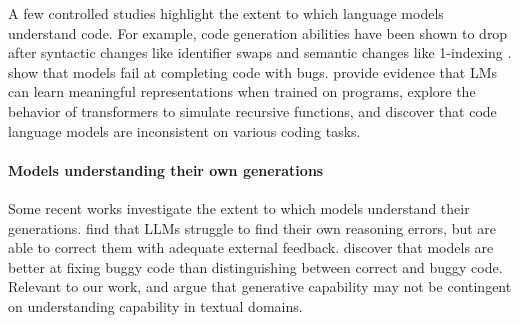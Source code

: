 A few controlled studies highlight the extent to which language models understand code. For example, code generation abilities have been shown to drop after syntactic changes like identifier swaps \citep{miceli2023larger} and semantic changes like 1-indexing \citep{wu2023reasoning}. \citet{dinh2024large} show that models fail at completing code with bugs. \citet{jin2023evidence} provide evidence that LMs can learn meaningful representations when trained on programs, \citet{zhang2023can} explore the behavior of transformers to simulate recursive functions, and \citet{min2023beyond} discover that code language models are inconsistent on various coding tasks.

\paragraph{Models understanding their own generations}
Some recent works investigate the extent to which models understand their generations. \citet{huang2023large, chen2024teaching, tyen2023llms, olausson2024repair} find that LLMs struggle to find their own reasoning errors, but are able to correct them with adequate external feedback. \citet{singhal2024nofuneval} discover that models are better at fixing buggy code than distinguishing between correct and buggy code. Relevant to our work, \citet{west2023generative} and \citet{oh2024generative} argue that generative capability may not be contingent on understanding capability in textual domains.